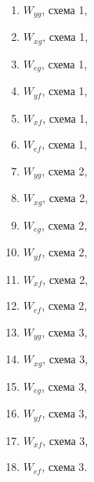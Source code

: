 \documentclass[a4paper,oneside,10pt]{book}
\theoremstyle{definition}
\begin{document}
\begin{multicols}{3}


	\begin{enumerate}
		\item $W_{yg}$, схема 1,
		\item $W_{xg}$, схема 1,
		\item $W_{eg}$, схема 1,
		\item $W_{yf}$, схема 1,
		\item $W_{xf}$, схема 1,
		\item $W_{ef}$, схема 1,

		\item $W_{yg}$, схема 2,
		\item $W_{xg}$, схема 2,
		\item $W_{eg}$, схема 2,
		\item $W_{yf}$, схема 2,
		\item $W_{xf}$, схема 2,
		\item $W_{ef}$, схема 2,

		\item $W_{yg}$, схема 3,
		\item $W_{xg}$, схема 3,
		\item $W_{eg}$, схема 3,
		\item $W_{yf}$, схема 3,
		\item $W_{xf}$, схема 3,
		\item $W_{ef}$, схема 3.





	\end{enumerate}
\end{multicols}
\end{document}
